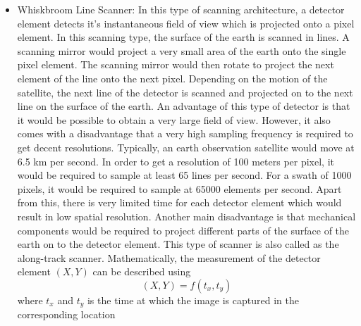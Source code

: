 \begin{itemize}
\item Whiskbroom Line Scanner: In this type of scanning architecture, a detector element detects it's instantaneous field of view which is projected onto a pixel element. In this scanning type, the surface of the earth is scanned in lines. A scanning mirror would project a very small area of the earth onto the single pixel element. The scanning mirror would then rotate to project the next element of the line onto the next pixel. Depending on the motion of the satellite, the next line of the detector is scanned and projected on to the next line on the surface of the earth. An advantage of this type of detector is that it would be possible to obtain a very large field of view. However, it also comes with a disadvantage that a very high sampling frequency is required to get decent resolutions. Typically, an earth observation satellite would move at 6.5 km per second. In order to get a resolution of 100 meters per pixel, it would be required to sample at least 65 lines per second. For a swath of 1000 pixels, it would be required to sample at 65000 elements per second. Apart from this, there is very limited time for each detector element which would result in low spatial resolution\cite{SpInst}. Another main disadvantage is that mechanical components would be required to project different parts of the surface of the earth on to the detector element. This type of scanner is also called as the along-track scanner. Mathematically, the measurement of the detector element $(X, Y)$ can be described using 
$$
(X, Y) = f(t_x, t_y)
$$
where $t_x$ and $t_y$ is the time at which the image is captured in the corresponding location
\begin{figure}[ht]
\centering
\begin{subfigure}{0.80\textwidth}
  \centering

\end{subfigure}
\end{figure}
\end{itemize}

